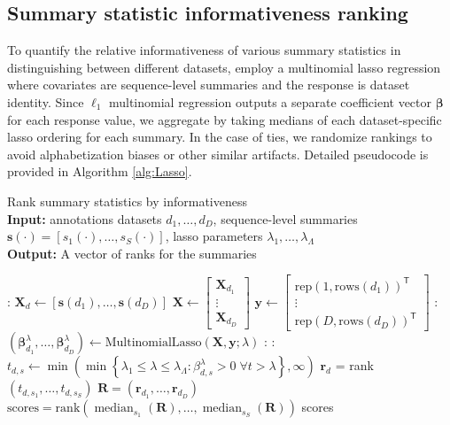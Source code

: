 \documentclass{article}
\newcommand{\median}{\operatorname{median}}
\begin{document}
\subsection*{Summary statistic informativeness ranking}
To quantify the relative informativeness of various summary statistics in distinguishing between different datasets, employ a multinomial lasso regression where covariates are sequence-level summaries and the response is dataset identity.
Since $\ell_1$ multinomial regression outputs a separate coefficient vector $\boldsymbol \beta$ for each response value, we aggregate by taking medians of each dataset-specific lasso ordering for each summary.
In the case of ties, we randomize rankings to avoid alphabetization biases or other similar artifacts.
Detailed pseudocode is provided in Algorithm \ref{alg:Lasso}.
\begin{algorithm}
    \caption{Rank summary statistics by informativeness\\
        \textbf{Input:} annotations datasets $d_1, \dotsc, d_D$, sequence-level summaries $\mathbf s(\cdot) = [s_1(\cdot), \dotsc, s_S(\cdot)]$, lasso parameters $\lambda_1, \dotsc, \lambda_\Lambda$ \\
        \textbf{Output:} A vector of ranks for the summaries }
    \label{alg:Lasso}
    \begin{algorithmic}
   		:
			\State $\mathbf X_d \gets [\mathbf s(d_1), \dotsc, \mathbf s(d_D)]$
    	\EndFor
		\State $\mathbf X \gets \begin{bmatrix}
			 \mathbf X_{d_1} \\ \vdots \\ \mathbf X_{d_D}
			 \end{bmatrix}$
		\State $\mathbf y \gets \begin{bmatrix}
			\text{rep}(1, \text{rows}(d_1))^\mathsf{T}
			\\ \vdots \\
			\text{rep}(D, \text{rows}(d_D))^\mathsf{T}
		\end{bmatrix}$
        :
        	\State $(\boldsymbol \beta_{d_1}^\lambda, \dotsc, \boldsymbol \beta_{d_D}^\lambda) \gets \text{MultinomialLasso}(\mathbf X, \mathbf y; \lambda)$
        \EndFor
        :
        	:
				\State $t_{d, s} \gets
				\min\left( \min \left\{ \lambda_1 \le \lambda \le \lambda_\Lambda: \beta_{d, s}^\lambda > 0 \;
					\forall t > \lambda \right\},
					\infty \right)$
			\EndFor
			\State $\mathbf r_d$ = rank$(t_{d, s_1}, \dotsc, t_{d, s_S})$
        \EndFor
        \State $\mathbf R = (\mathbf r_{d_1}, \dotsc, \mathbf r_{d_D})$
        \State $\text{scores} = \text{rank}\left( \median_{s_1}(\mathbf R),
        	 \dotsc, \median_{s_S}(\mathbf R) \right)$
       \State \Return scores
    \end{algorithmic}
\end{algorithm}
\end{document}
